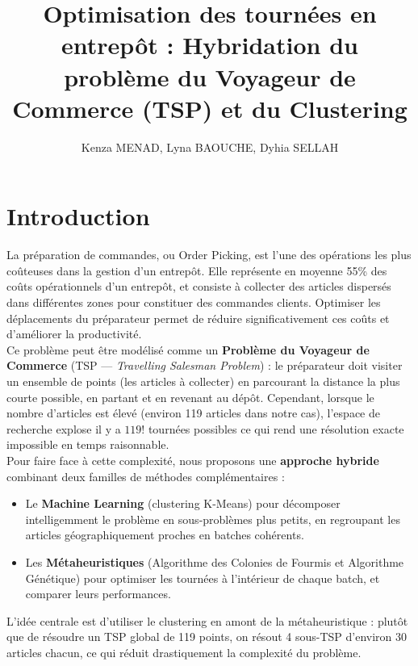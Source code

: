 \documentclass[a4paper, 12pt, twoside]{report}
\author{Kenza MENAD, Lyna BAOUCHE, Dyhia SELLAH}
\title{Optimisation des tournées en entrepôt : Hybridation du problème du Voyageur de
Commerce (TSP) et du Clustering}
\begin{document}
\pagedegarde
\tableofcontents

\chapter{Introduction}
La préparation de commandes, ou Order Picking, est l'une des
opérations les plus coûteuses dans la gestion d'un entrepôt. Elle représente
en moyenne 55\% des coûts opérationnels d'un entrepôt, et consiste à collecter
des articles dispersés dans différentes zones pour constituer des commandes
clients. Optimiser les déplacements du préparateur permet de réduire
significativement ces coûts et d'améliorer la productivité.\\

Ce problème peut être modélisé comme un \textbf{Problème du Voyageur de
Commerce} (TSP — \textit{Travelling Salesman Problem}) : le préparateur
doit visiter un ensemble de points (les articles à collecter) en parcourant
la distance la plus courte possible, en partant et en revenant au dépôt.
Cependant, lorsque le nombre d'articles est élevé (environ 119 articles
dans notre cas), l'espace de recherche explose il y a $119!$ tournées
possibles ce qui rend une résolution exacte impossible en temps raisonnable.\\

Pour faire face à cette complexité, nous proposons une \textbf{approche hybride}
combinant deux familles de méthodes complémentaires :\\

\begin{itemize}
    \item Le \textbf{Machine Learning} (clustering K-Means) pour décomposer
    intelligemment le problème en sous-problèmes plus petits, en regroupant
    les articles géographiquement proches en batches cohérents.

    \item Les \textbf{Métaheuristiques} (Algorithme des Colonies de Fourmis
    et Algorithme Génétique) pour optimiser les tournées à l'intérieur de
    chaque batch, et comparer leurs performances.\\
\end{itemize}

L'idée centrale est d'utiliser le clustering en amont de la
métaheuristique : plutôt que de résoudre un TSP global de 119 points,
on résout 4 sous-TSP d'environ 30 articles chacun, ce qui réduit
drastiquement la complexité du problème.
\end{document}
